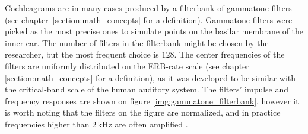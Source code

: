 Cochleagrams are in many cases produced by a filterbank of gammatone filters (see chap\-ter~\ref{section:math_concepts} for a definition). Gammatone filters were picked as the most precise ones to simulate points on the basilar membrane of the inner ear. The number of filters in the filterbank might be chosen by the researcher, but the most frequent choice is $128$. The center frequencies of the filters are uniformly distributed on the ERB-rate scale (see chapter \ref{section:math_concepts} for a definition), as it was developed to be similar with the critical-band scale of the human auditory system. The filters' impulse and frequency responses are shown on figure \ref{img:gammatone_filterbank}, however it is worth noting that the filters on the figure are normalized, and in practice frequencies higher than 2\,kHz are often amplified \cite{Wang2006}.\\

